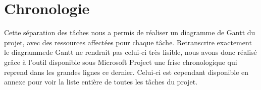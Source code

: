 \section{Chronologie}
\label{sec:chronologie}

	Cette séparation des tâches nous a permis de réaliser un diagramme de Gantt du projet, avec des ressources affectées pour chaque tâche. Retranscrire exactement le diagrammede Gantt ne rendrait pas celui-ci très lisible, nous avons donc réalisé grâce à l'outil disponible sous Microsoft Project une frise chronologique qui reprend dans les grandes lignes ce dernier. Celui-ci est cependant disponible en annexe pour voir la liste entière de toutes les tâches du projet.

	